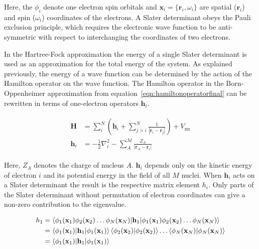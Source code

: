 Here, the $\phi_i$ denote one electron spin orbitals and
$\mathbf{x}_i=\{\mathbf{r}_i,\omega_i\}$ are spatial ($\mathbf{r}_i$) and spin
($\omega_i$) coordinates of the electrons. A Slater determinant obeys the Pauli
exclusion principle, which requires the electronic wave function to be
anti-symmetric with respect to interchanging the coordinates of two electrons.

In the Hartree-Fock approximation the energy of a single Slater determinant is
used as an approximation for the total energy of the system. As explained
previously, the energy of a wave function can be determined by the action of
the Hamilton operator on the wave function. The Hamilton operator in the
Born-Oppenheimer approximation from equation~\eqref{eqn:hamiltonoperatorfinal}
can be rewritten in terms of one-electron operators $\mathbf{h}_i$.

\begin{align}
\begin{aligned}
    \mathbf{H}&=\sum_i^N\left(\mathbf{h}_i + \sum_{j>i}^N\frac{1}{|\mathbf{r}_i-\mathbf{r}_j|}\right) + V_\text{nn} \\
    \mathbf{h}_i&=-\frac{1}{2}\nabla_i^2-\sum_A^M\frac{Z_A}{|\mathbf{r}_A-\mathbf{r}_i|}\label{eqn:hamiltonoperatorhartreefock}
\end{aligned}
\end{align}

Here, $Z_A$ denotes the charge of nucleus $A$. $\mathbf{h}_i$ depends only on
the kinetic energy of electron $i$ and its potential energy in the field of all
$M$ nuclei. When $\mathbf{h}_i$ acts on a Slater determinant the result is the
respective matrix element $h_i$. Only parts of the Slater determinant without
permutation of electron coordinates can give a non-zero contribution to the
eigenvalue.

\begin{align}
    \begin{aligned}
        h_1&=\braket{\phi_1(\mathbf{x}_1)\phi_2(\mathbf{x}_2)\ldots\phi_N(\mathbf{x}_N)|\mathbf{h}_1|\phi_1(\mathbf{x}_1)\phi_2(\mathbf{x}_2)\ldots\phi_N(\mathbf{x}_N)}\\
        &=\braket{\phi_1(\mathbf{x}_1)|\mathbf{h}_1|\phi_1(\mathbf{x}_1)}\braket{\phi_2(\mathbf{x}_2)|\phi_2(\mathbf{x}_2)}\ldots\braket{\phi_N(\mathbf{x}_N)|\phi_N(\mathbf{x}_N)} \\
        &=\braket{\phi_1(\mathbf{x}_1)|\mathbf{h}_1|\phi_1(\mathbf{x}_1)}
    \end{aligned}
\end{align}

